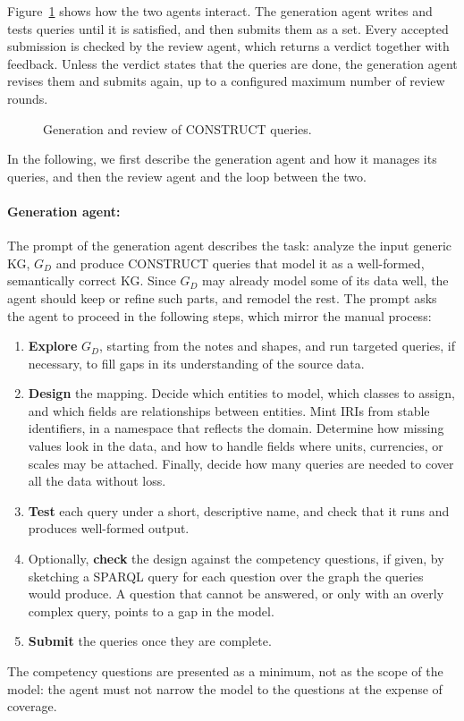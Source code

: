 Figure~\ref{fig:approach-review} shows how the two agents interact. The generation agent writes and tests queries until it is satisfied, and then submits them as a set. Every accepted submission is checked by the review agent, which returns a verdict together with feedback. Unless the verdict states that the queries are done, the generation agent revises them and submits again, up to a configured maximum number of review rounds. 

\begin{figure}[!htbp]
  \centering
  
  \caption{Generation and review of CONSTRUCT queries.}
  \label{fig:approach-review}
\end{figure}

In the following, we first describe the generation agent and how it manages its queries, and then the review agent and the loop between the two.

\paragraph{Generation agent:}
The prompt of the generation agent describes the task: analyze the input generic KG, \(G_D\) and produce CONSTRUCT queries that model it as a well-formed, semantically correct KG\@. Since \(G_D\) may already model some of its data well, the agent should keep or refine such parts, and remodel the rest. The prompt asks the agent to proceed in the following steps, which mirror the manual process:
\begin{enumerate}[leftmargin=*, itemsep=2pt]
  \item \textbf{Explore} \(G_D\), starting from the notes and shapes, and run targeted queries, if necessary, to fill gaps in its understanding of the source data.
  \item \textbf{Design} the mapping. Decide which entities to model, which classes to assign, and which fields are relationships between entities. Mint IRIs from stable identifiers, in a namespace that reflects the domain. Determine how missing values look in the data, and how to handle fields where units, currencies, or scales may be attached. Finally, decide how many queries are needed to cover all the data without loss.
  \item \textbf{Test} each query under a short, descriptive name, and check that it runs and produces well-formed output.
  \item Optionally, \textbf{check} the design against the competency questions, if given, by sketching a SPARQL query for each question over the graph the queries would produce. A question that cannot be answered, or only with an overly complex query, points to a gap in the model.
  \item \textbf{Submit} the queries once they are complete.
\end{enumerate}
The competency questions are presented as a minimum, not as the scope of the model: the agent must not narrow the model to the questions at the expense of coverage.

